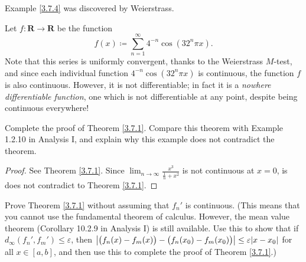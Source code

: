 \begin{note}
    Example \ref{3.7.4} was discovered by Weierstrass.
\end{note}

\begin{example}\label{3.7.4}
    Let \(f : \mathbf{R} \to \mathbf{R}\) be the function
    \[
        f(x) \coloneqq \sum_{n = 1}^\infty 4^{-n} \cos(32^n \pi x).
    \]
    Note that this series is uniformly convergent, thanks to the Weierstrass \(M\)-test, and since each individual function \(4^{-n} \cos(32^n \pi x)\) is continuous, the function \(f\) is also continuous.
    However, it is not differentiable;
    in fact it is a \emph{nowhere differentiable function}, one which is not differentiable at any point, despite being continuous everywhere!
\end{example}

\exercisesection

\begin{exercise}\label{ex 3.7.1}
    Complete the proof of Theorem \ref{3.7.1}.
    Compare this theorem with Example 1.2.10 in Analysis I, and explain why this example does not contradict the theorem.
\end{exercise}

\begin{proof}
    See Theorem \ref{3.7.1}.
    Since \(\lim_{n \to \infty} \frac{x^3}{\frac{1}{n} + x^2}\) is not continuous at \(x = 0\), is does not contradict to Theorem \ref{3.7.1}.
\end{proof}

\begin{exercise}\label{ex 3.7.2}
    Prove Theorem \ref{3.7.1} without assuming that \(f_n'\) is continuous.
    (This means that you cannot use the fundamental theorem of calculus.
    However, the mean value theorem (Corollary 10.2.9 in Analysis I) is still available.
    Use this to show that if \(d_\infty(f_n', f_m') \leq \varepsilon\), then \(\abs*{\big(f_n(x) - f_m(x)\big) - \big(f_n(x_0) - f_m(x_0)\big)} \leq \varepsilon \abs*{x - x_0}\) for all \(x \in [a, b]\), and then use this to complete the proof of Theorem \ref{3.7.1}.)
\end{exercise}


